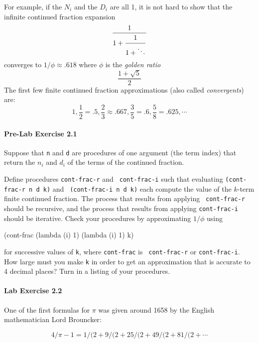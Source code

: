 For example, if the $N_i$ and the $D_i$ are all 1, it is not
hard to show that the infinite continued fraction expansion
\begin{displaymath}
{1 \over {\displaystyle 1 +
        {\strut 1 \over {\displaystyle 1 +\ddots } }}}
\end{displaymath}
converges to $1/\phi\approx .618$ where $\phi$ is the {\em golden ratio}
\begin{displaymath}
\frac{1+ \sqrt{5}}{2}
\end{displaymath}
The first few finite continued fraction approximations (also called
{\em convergents})  are:
\begin{displaymath}
1, \frac{1}{2}=.5, \frac{2}{3}\approx .667, \frac{3}{5}=.6,
\frac{5}{8}=.625, \cdots
\end{displaymath}

\paragraph{Pre-Lab Exercise 2.1}
Suppose that {\tt n} and {\tt d} are procedures
of one argument (the term index) that return the
$n_i$ and $d_i$ of the terms of the continued fraction.

Define procedures {\tt cont-frac-r} and {\tt
cont-frac-i} such that evaluating {\tt (cont-frac-r n d k)} and {\tt
(cont-frac-i n d k)} each compute the value of the $k$-term finite
continued fraction.  The process that results from applying {\tt
cont-frac-r} should be recursive, and the process that results from
applying {\tt cont-frac-i} should be iterative.  Check your procedures
by approximating $1/\phi$ using

\beginlisp
(cont-frac (lambda (i) 1)
           (lambda (i) 1)
           k)
\endlisp

for successive values of {\tt k}, where {\tt cont-frac} is {\tt
cont-frac-r} or {\tt cont-frac-i}.  How large must you make {\tt k}
in order to get an approximation that is accurate to 4 decimal places?
Turn in a listing of your procedures.

\paragraph{Lab Exercise 2.2}
One of the first formulas for $\pi$ was given around 1658 by the
English mathematician Lord Brouncker:

\begin{displaymath}
4/\pi -1  =  1/(2 + 9/(2 + 25/ (2 + 49/ (2 + 81 /(2 + \cdots
\end{displaymath}

